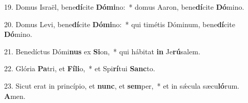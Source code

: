 19. Domus Israël, bene\textbf{dí}cite \textbf{Dó}\textbf{mi}no:~*  domus Aaron, bene\textbf{dí}cite \textbf{Dó}mino.\

20. Domus Levi, bene\textbf{dí}cite \textbf{Dó}\textbf{mi}no:~*  qui timétis Dóminum, bene\textbf{dí}cite \textbf{Dó}mino.\

21. Benedíctus Dómi\textbf{nus} ex \textbf{Si}on,~*  qui hábitat \textbf{in} Je\textbf{rú}salem.\

22. Glória \textbf{Pa}tri, et \textbf{Fí}\textbf{li}o,~*  et Spi\textbf{rí}tui \textbf{Sanc}to.\

23. Sicut erat in princípio, et \textbf{nunc}, et \textbf{sem}per,~*  et in sǽcula sæcu\textbf{ló}rum. \textbf{A}men.\

